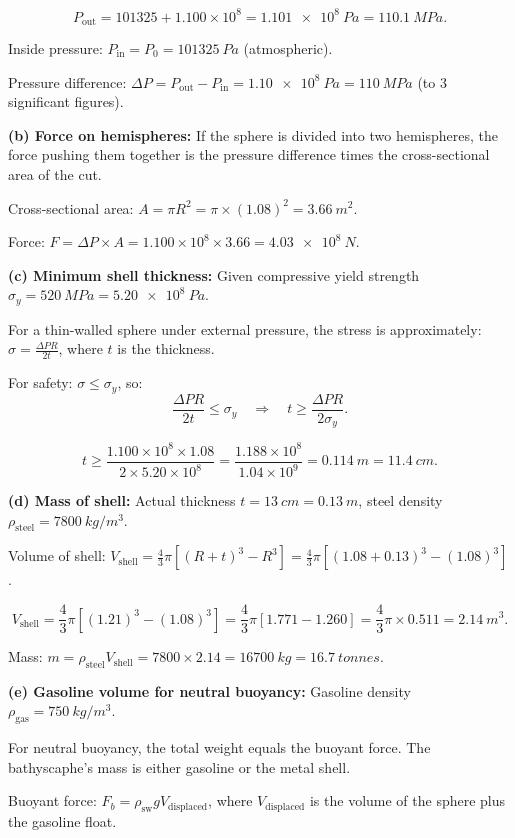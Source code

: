 \documentclass[11pt]{article}
\newcommand{\ans}[1]{\boxed{\displaystyle #1}}
\begin{document}
\[ P_{\text{out}} = 101325 + 1.100 \times 10^8 = \SI{1.101e8}{Pa} = \SI{110.1}{MPa}. \]

Inside pressure: $P_{\text{in}} = P_0 = \SI{101325}{Pa}$ (atmospheric).

Pressure difference: $\Delta P = P_{\text{out}} - P_{\text{in}} = \ans{\SI{1.10e8}{Pa} = \SI{110}{MPa}}$ (to 3 significant figures).

\textbf{(b) Force on hemispheres:} If the sphere is divided into two hemispheres, the force pushing them together is the pressure difference times the cross-sectional area of the cut.

Cross-sectional area: $A = \pi R^2 = \pi \times (1.08)^2 = \SI{3.66}{m^2}$.

Force: $F = \Delta P \times A = 1.100 \times 10^8 \times 3.66 = \ans{\SI{4.03e8}{N}}$.

\textbf{(c) Minimum shell thickness:} Given compressive yield strength $\sigma_y = \SI{520}{MPa} = \SI{5.20e8}{Pa}$.

For a thin-walled sphere under external pressure, the stress is approximately: $\sigma = \frac{\Delta P R}{2t}$, where $t$ is the thickness.

For safety: $\sigma \leq \sigma_y$, so:
\[ \frac{\Delta P R}{2t} \leq \sigma_y \quad\Rightarrow\quad t \geq \frac{\Delta P R}{2\sigma_y}. \]

\[ t \geq \frac{1.100 \times 10^8 \times 1.08}{2 \times 5.20 \times 10^8} = \frac{1.188 \times 10^8}{1.04 \times 10^9} = \ans{\SI{0.114}{m} = \SI{11.4}{cm}}. \]

\textbf{(d) Mass of shell:} Actual thickness $t = \SI{13}{cm} = \SI{0.13}{m}$, steel density $\rho_{\text{steel}} = \SI{7800}{kg/m^3}$.

Volume of shell: $V_{\text{shell}} = \frac{4}{3}\pi[(R+t)^3 - R^3] = \frac{4}{3}\pi[(1.08+0.13)^3 - (1.08)^3]$.

\[ V_{\text{shell}} = \frac{4}{3}\pi[(1.21)^3 - (1.08)^3] = \frac{4}{3}\pi[1.771 - 1.260] = \frac{4}{3}\pi \times 0.511 = \SI{2.14}{m^3}. \]

Mass: $m = \rho_{\text{steel}} V_{\text{shell}} = 7800 \times 2.14 = \ans{\SI{16700}{kg} = \SI{16.7}{tonnes}}$.

\textbf{(e) Gasoline volume for neutral buoyancy:} Gasoline density $\rho_{\text{gas}} = \SI{750}{kg/m^3}$.

For neutral buoyancy, the total weight equals the buoyant force. The bathyscaphe's mass is either gasoline or the metal shell.

Buoyant force: $F_b = \rho_{\text{sw}} g V_{\text{displaced}}$, where $V_{\text{displaced}}$ is the volume of the sphere plus the gasoline float.
\end{document}
